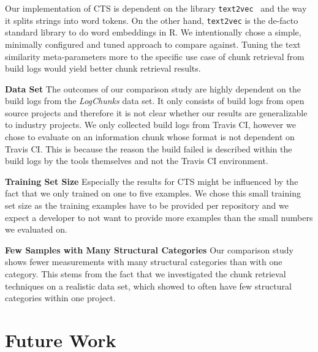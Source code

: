 Our implementation of CTS is dependent on the library
{\tt text2vec}~\cite{text2vec2019webpage}
and the way it splits strings into word tokens.
On the other hand,
{\tt text2vec} is the de-facto standard library to do word embeddings
in R.
We intentionally chose a simple, minimally configured and tuned
approach to compare against.
Tuning the text similarity
meta-parameters more to the specific use case of chunk retrieval from
build logs would yield better chunk retrieval results.

\noindent
\textbf{Data Set}
The outcomes of our comparison study are highly dependent on the build
logs from the \emph{LogChunks} data set.
It only consists of build
logs from open source projects and therefore it is not clear whether
our results are generalizable to industry projects.
We only collected
build logs from Travis CI, however we chose to evaluate on an
information chunk whose format is not dependent on Travis CI\@.
This
is because the reason the build failed is described within the build
logs by the tools themselves and not the Travis CI environment.

\noindent
\textbf{Training Set Size}
Especially the results for CTS might be influenced by the fact that we
only trained on one to five examples.
We chose this small training set
size as the training examples have to be provided per repository and
we expect a developer to not want to provide more examples than the
small numbers we evaluated on.

\noindent
\textbf{Few Samples with Many Structural Categories}
Our comparison study shows fewer measurements with many structural
categories than with one category.
This stems from the fact that we investigated the chunk retrieval
techniques on a realistic data set, which showed to often have few
structural categories within one project.

\section{Future Work}

